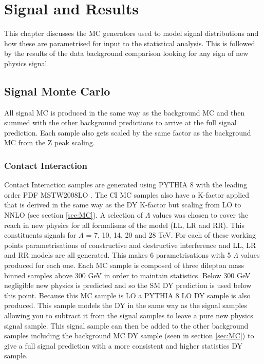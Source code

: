 \chapter{Signal and Results}

This chapter discusses the MC generators used to model signal distributions and how these are parametrised for input to the statistical analysis. This is followed by the results of the data background comparison looking for any sign of new physics signal.

\section{Signal Monte Carlo}

	All signal MC is produced in the same way as the background MC and then summed with the other background predictions to arrive at the full signal prediction. Each sample also gets scaled by the same factor as the background MC from the Z peak scaling. \\


	\subsection*{Contact Interaction}

	Contact Interaction samples are generated using PYTHIA 8 \cite{Sjostrand:2007gs} with the leading order PDF MSTW2008LO \cite{Martin:2009iq}. The CI MC samples also have a K-factor applied that is derived in the same way as the DY K-factor but scaling from LO to NNLO (see section \ref{sec:MC}). A selection of $\Lambda$ values was chosen to cover the reach in new physics for all formalisms of the model (LL, LR and RR). This constituents signals for $\Lambda$ = 7, 10, 14, 20 and 28 TeV. For each of these working points parametrisations of constructive and destructive interference and LL, LR and RR models are all generated. This makes 6 parametrisations with 5 $\Lambda$ values produced for each one. Each MC sample is composed of three dilepton mass binned samples above 300 GeV in order to maintain statistics. Below 300 GeV negligible new physics is predicted and so the SM DY prediction is used below this point. 
	Because this MC sample is LO a PYTHIA 8 LO DY sample is also produced. This sample models the DY in the same way as the signal samples allowing you to subtract it from the signal samples to leave a pure new physics signal sample. This signal sample can then be added to the other background samples including the background MC DY sample (seen in section \ref{sec:MC}) to give a full signal prediction with a more consistent and higher statistics DY sample.


